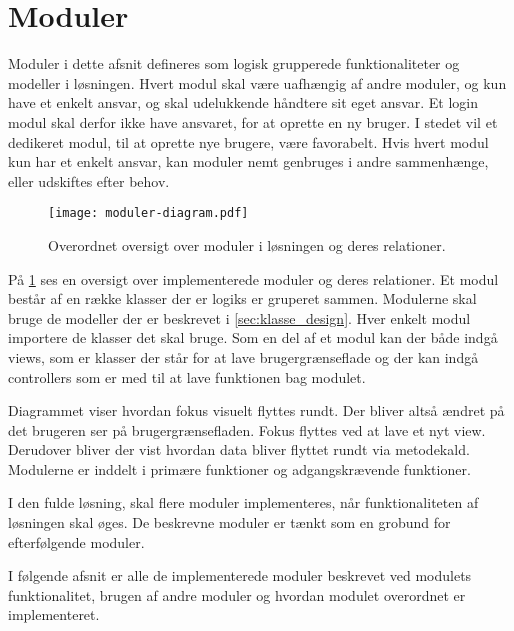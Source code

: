 \section{Moduler}
\label{sec:moduler}

Moduler i dette afsnit defineres som logisk grupperede funktionaliteter og modeller i løsningen. Hvert modul skal være uafhængig af andre moduler, og kun have et enkelt ansvar, og skal udelukkende håndtere sit eget ansvar. Et login modul skal derfor ikke have ansvaret, for at oprette en ny bruger. I stedet vil et dedikeret modul, til at oprette nye brugere, være favorabelt. Hvis hvert modul kun har et enkelt ansvar, kan moduler nemt genbruges i andre sammenhænge, eller udskiftes efter behov.

\begin{figure}
  \centering
  \texttt{[image: moduler-diagram.pdf]}
  \caption{Overordnet oversigt over moduler i løsningen og deres relationer.}
  \label{fig:mod}
\end{figure}



På \cref{fig:mod} ses en oversigt over implementerede moduler og deres relationer. Et modul består af en række klasser der er logiks er gruperet sammen. Modulerne skal bruge de modeller der er beskrevet i \cref{sec:klasse_design}. Hver enkelt modul importere de klasser det skal bruge. Som en del af et modul kan der både indgå views, som er klasser der står for at lave brugergrænseflade og der kan indgå controllers som er med til at lave funktionen bag modulet.


Diagrammet viser hvordan fokus visuelt flyttes rundt. Der bliver altså ændret på det brugeren ser på brugergrænsefladen. Fokus flyttes ved at lave et nyt view. Derudover bliver der vist hvordan data bliver flyttet rundt via metodekald. Modulerne er inddelt i primære funktioner og adgangskrævende funktioner.

I den fulde løsning, skal flere moduler implementeres, når funktionaliteten af løsningen skal øges. De beskrevne moduler er tænkt som en grobund for efterfølgende moduler.

I følgende afsnit er alle de implementerede moduler beskrevet ved modulets funktionalitet, brugen af andre moduler og hvordan modulet overordnet er implementeret.








